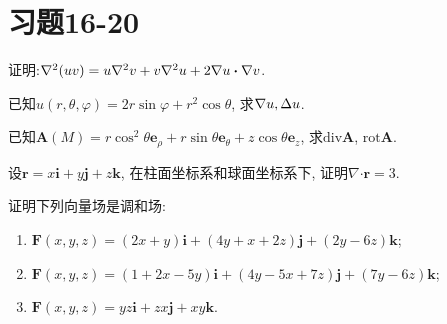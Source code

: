 \section{习题16-20}

\begin{yyEx}
	证明:$\nabla^2(uv) = u\nabla^2 v+v\nabla^2u+2\nabla u\bm{\cdot}\nabla v$.
\end{yyEx}

\begin{yyEx}
	已知$u(r,\theta,\varphi) = 2r\sin\varphi+r^2\cos\theta$, 求$\nabla u,\Delta u$.
\end{yyEx}

\begin{yyEx}
	已知$\bm{A}(M) = r\cos^2\theta\bm{e}_{\rho} + r\sin\theta\bm{e}_{\theta} + z\cos\theta\bm{e}_{z}$, 求$\mathrm{div}\bm{A}$, $\mathrm{rot}\bm{A}$.
\end{yyEx}

\begin{yyEx}
	设$\bm{r} = x\bm{i}+y\bm{j}+z\bm{k}$, 在柱面坐标系和球面坐标系下, 证明$\nabla\bm{\cdot} \bm{r} = 3$.
\end{yyEx}

\begin{yyEx}
	证明下列向量场是调和场:
	\begin{enumerate}
		\item $\bm{F}(x,y,z) = (2x+y)\bm{i}+(4y+x+2z)\bm{j}+(2y-6z)\bm{k}$;
		\item $\bm{F}(x,y,z) = (1+2x-5y)\bm{i}+(4y-5x+7z)\bm{j}+(7y-6z)\bm{k}$;
		\item $\bm{F}(x,y,z) = yz\bm{i}+zx\bm{j}+xy\bm{k}$.
	\end{enumerate}
\end{yyEx}
